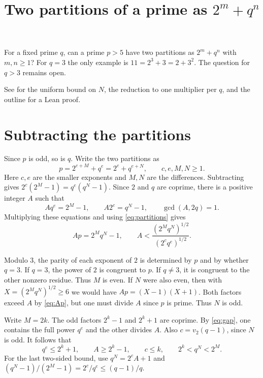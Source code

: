 \documentclass[11pt]{article}
\title{Two partitions of a prime as \texorpdfstring{$2^m+q^n$}{2^m + q^n}}
\author{}
\date{}
\begin{document}
\maketitle

For a fixed prime $q$, can a prime $p>5$ have two partitions
as $2^m+q^n$ with $m,n\ge1$? For $q=3$ the only example is
$11=2^3+3=2+3^2$. The question for $q>3$ remains open.

See  for the uniform bound on $N$,
the reduction to one multiplier per $q$, and the outline for a Lean proof.

\section{Subtracting the partitions}

Since $p$ is odd, so is $q$. Write the two partitions as
\begin{equation}\label{eq:partitions}
p=2^{c+M}+q^e=2^c+q^{e+N},
\qquad c,e,M,N\ge1.
\end{equation}
Here $c,e$ are the smaller exponents and $M,N$ are the differences.
Subtracting gives $2^c(2^M-1)=q^e(q^N-1)$. Since $2$ and $q$ are coprime,
there is a positive integer $A$ such that
\begin{equation}\label{eq:gap}
Aq^e=2^M-1,\qquad A2^c=q^N-1,\qquad \gcd(A,2q)=1.
\end{equation}
Multiplying these equations and using \eqref{eq:partitions} gives
\begin{equation}\label{eq:Ap}
Ap=2^M q^N-1,\qquad A<\frac{(2^M q^N)^{1/2}}{(2^c q^e)^{1/2}}.
\end{equation}

Modulo $3$, the parity of each exponent of $2$ is determined by $p$
and by whether $q=3$. If $q=3$, the power of $2$ is congruent to $p$.
If $q\ne3$, it is congruent to the other nonzero residue.
Thus $M$ is even. If $N$ were also even, then with
$X=(2^M q^N)^{1/2}\ge6$ we would have $Ap=(X-1)(X+1)$.
Both factors exceed $A$ by \eqref{eq:Ap}, but one must divide $A$
since $p$ is prime. Thus $N$ is odd.

Write $M=2k$. The odd factors $2^k-1$ and $2^k+1$ are coprime.
By \eqref{eq:gap}, one contains the full power $q^e$ and the other
divides $A$. Also $c=v_2(q-1)$, since $N$ is odd. It follows that
\begin{equation}\label{eq:size}
q^e\le2^k+1,\qquad A\ge2^k-1,\qquad
c\le k,\qquad 2^k<q^N<2^M.
\end{equation}
For the last two-sided bound, use $q^N=2^c A+1$ and
$(q^N-1)/(2^M-1)=2^c/q^e\le(q-1)/q$.
\end{document}
